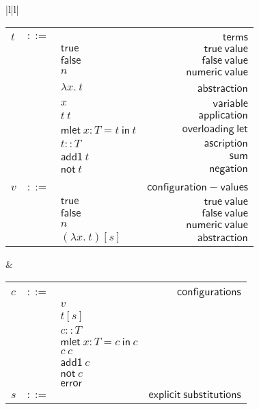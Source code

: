 \documentclass[preprint,authoryear,sort&compress,9pt,nocopyrightspace]{article}
\newcommand{\conf}[2][s]{(#2)[#1]}
\newcommand{\ascrip}[1]{#1::T}
\newcommand{\oletD}{\mathsf{mlet} \ x : T = t \ \mathsf{in}  \ t}
\newcommand{\oletP}[3]{\mathsf{mlet} \ x : #1 = #2 \ \mathsf{in}  \ #3}
\newcommand{\app}[2]{#1 \ #2}
\newcommand{\absST}[2]{\lambda #1. \ #2}
\newcommand{\negacion}[1]{\mathsf{not} \ #1}
\newcommand{\suma}[1]{\mathsf{add1} \ #1}
\newcommand{\truet}{\mathsf{true}}
\newcommand{\falset}{\mathsf{false}}
\begin{document}
\setlength{\topmargin}{-25mm}
\setlength{\textheight}{230mm}
\begin{figure}
\begin{small}
\begin{center}
\hspace*{-2cm}
\begin{tabular}{|l|l|}
\hline
\begin{tabular}{l c l r}
&&&\\
$t$&$::=$&&$\mathsf {terms}$\\
&&$\truet$&$\mathsf {true \ value}$\\
&&$\falset$&$\mathsf {false \ value}$\\
&&$n$&$\mathsf {numeric \ value}$\\
&&$\absST {x}{t}$&\ $\mathsf {abstraction}$\\
&&$x$&$\mathsf {variable}$\\
&&$\app {t}{t}$&$\mathsf {application}$\\
&&$\oletD$&$\mathsf {overloading \ let}$\\
&&$\ascrip {t}$&$\mathsf {ascription}$\\
&&$\suma{t}$&$\mathsf {sum}$\\
&&$\negacion{t}$&$\mathsf {negation}$\\
&&&\\
$v$&$::=$&&$\mathsf {configuration-values}$\\
&&$\truet$&$\mathsf{true \ value} $\\
&&$\falset$&$\mathsf{false \ value}$\\
&&$n$&$\mathsf{numeric \ value} $\\
&&$\conf{\absST {x}{t}}$&$\mathsf{abstraction}$\\
\end{tabular}
& \begin{tabular}{l c l r}
&&&\\
$c$&$::=$&&$\mathsf {configurations}$\\
&&$v$&\\
&&$t[s]$&\\
&&$\ascrip{c}$&\\
&&$\oletP {T}{c}{c}$&\\
&&$c \ c $&\\
&&$\suma{c}$&\\
&&$\negacion{c}$&\\
&&$\mathsf{error}$&\\
$s$&$::=$&&$\mathsf {explicit \ substitutions}$\\

\end{tabular}
\end{tabular}
\end{center}
\end{small}
\end{figure}
\end{document}
